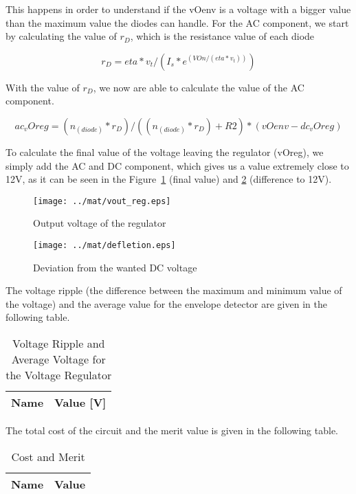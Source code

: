 This happens in order to understand if the vOenv is a voltage with a bigger value than the maximum value the diodes can handle.
For the AC component, we start by calculating the value of $r_D$, which is the resistance value of each diode

\begin{equation}
r_D = eta*v_t/(I_s*e^(VOn/(eta*v_t)))
\label{eq:1.6}
\end{equation}

With the value of $r_D$, we now are able to calculate the value of the AC component.

\begin{equation}
ac_vOreg = (n_(diode)*r_D)/((n_(diode)*r_D)+R2)*(vOenv-dc_vOreg)
\label{eq:1.7}
\end{equation}

To calculate the final value of the voltage leaving the regulator (vOreg), we simply add the AC and DC component, which gives us a value extremely close to 12V, as it can be seen in the Figure~\ref{fig:mat5} (final value) and \ref{fig:mat6} (difference to 12V).

\begin{figure}[H] \centering
\texttt{[image: ../mat/vout\_reg.eps]}
\caption{Output voltage of the regulator}
\label{fig:mat5}
\end{figure}

\begin{figure}[H] \centering
\texttt{[image: ../mat/defletion.eps]}
\caption{Deviation from the wanted DC voltage} 
\label{fig:mat6}
\end{figure}

The voltage ripple (the difference between the maximum and minimum value of the voltage) and the average value for the envelope detector are given in the following table.

\begin{table}[H]
  \centering
  \begin{tabular}{|l|r|}
    \hline    
    {\bf Name} & {\bf Value [V]} \\ \hline
    
  \end{tabular}
  \caption{Voltage Ripple and Average Voltage for the Voltage Regulator}
  \label{tab:mat7}
\end{table}

The total cost of the circuit and the merit value is given in the following table.

\begin{table}[H]
  \centering
  \begin{tabular}{|l|r|}
    \hline    
    {\bf Name} & {\bf Value} \\ \hline
    
  \end{tabular}
  \caption{Cost and Merit}
  \label{tab:mat7}
\end{table}





